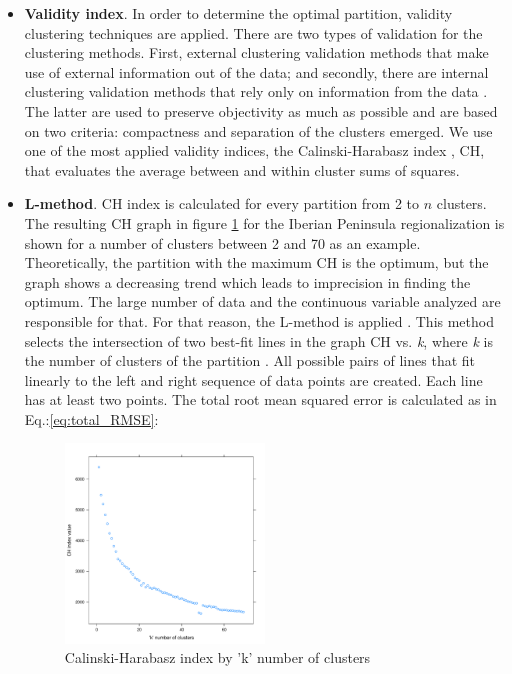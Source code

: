 \begin{itemize}
\item \textbf{Validity index}. In order to determine the optimal partition, validity clustering techniques are applied. There are two types of validation for the clustering methods. First, external clustering validation methods that make use of external information out of the data; and secondly, there are internal clustering validation methods that rely only on information from the data \cite*{Liu2010}. The latter are used to preserve objectivity as much as possible and are based on two criteria: compactness and separation of the clusters emerged. We use one of the most applied validity indices, the Calinski-Harabasz index \cite*{CalinskiH}, CH, that evaluates the average between and within cluster sums of squares.
\item \textbf{L-method}. CH index is calculated for every partition from 2 to $n$ clusters. The resulting CH graph in figure \ref{CHindex} for the Iberian Peninsula regionalization is shown for a number of clusters between 2 and 70 as an example. Theoretically, the partition with the maximum CH is the optimum, but the graph shows a decreasing trend which leads to imprecision in finding the optimum. The large number of data and the continuous variable analyzed are responsible for that. For that reason, the L-method is applied \cite*{Salvador2004}. This method selects the intersection of two best-fit lines in the graph CH vs. \textit{k}, where \textit{k} is the number of clusters of the partition \cite*{Zagouras2013}. All possible pairs of lines that fit linearly to the left and right sequence of data points are created. Each line has at least two points. The total root mean squared error is calculated as in Eq.:\ref{eq:total_RMSE}:

\begin{figure}[h!]
\centering\includegraphics[width=0.5\textwidth]{figs/capitulo5/CHindex}
\caption[Calinski-Harabasz index by number of clusters]{Calinski-Harabasz index by 'k' number of clusters}
\label{CHindex}
\end{figure}
 

\end{itemize}
